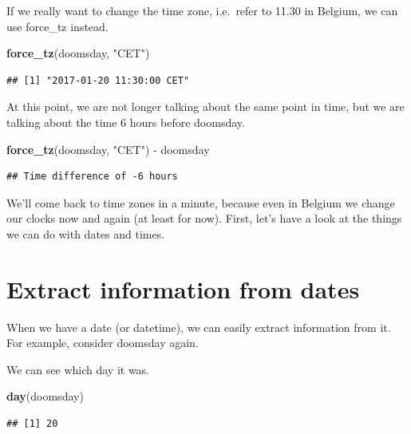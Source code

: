 \documentclass[]{tufte-book}
\newenvironment{Shaded}{}{}
\newcommand{\KeywordTok}[1]{\textcolor[rgb]{0.00,0.44,0.13}{\textbf{#1}}}
\newcommand{\NormalTok}[1]{#1}
\newcommand{\OperatorTok}[1]{\textcolor[rgb]{0.40,0.40,0.40}{#1}}
\newcommand{\StringTok}[1]{\textcolor[rgb]{0.25,0.44,0.63}{#1}}
\begin{document}
If we really want to change the time zone, i.e.~refer to 11.30 in Belgium, we can use force\_tz instead.

\begin{Shaded}
\begin{Highlighting}[]
\KeywordTok{force_tz}\NormalTok{(doomsday, }\StringTok{"CET"}\NormalTok{)}
\end{Highlighting}
\end{Shaded}

\begin{verbatim}
## [1] "2017-01-20 11:30:00 CET"
\end{verbatim}

At this point, we are not longer talking about the same point in time, but we are talking about the time 6 hours before doomsday.

\begin{Shaded}
\begin{Highlighting}[]
\KeywordTok{force_tz}\NormalTok{(doomsday, }\StringTok{"CET"}\NormalTok{) }\OperatorTok{-}\StringTok{ }\NormalTok{doomsday}
\end{Highlighting}
\end{Shaded}

\begin{verbatim}
## Time difference of -6 hours
\end{verbatim}

We'll come back to time zones in a minute, because even in Belgium we change our clocks now and again (at least for now). First, let's have a look at the things we can do with dates and times.

\hypertarget{extract-information-from-dates}{%
\section{Extract information from dates}\label{extract-information-from-dates}}

When we have a date (or datetime), we can easily extract information from it. For example, consider doomsday again.

We can see which day it was.

\begin{Shaded}
\begin{Highlighting}[]
\KeywordTok{day}\NormalTok{(doomsday)}
\end{Highlighting}
\end{Shaded}

\begin{verbatim}
## [1] 20
\end{verbatim}
\end{document}
